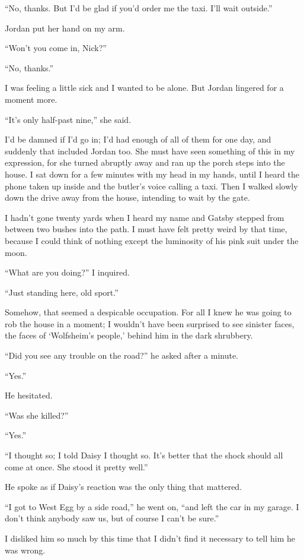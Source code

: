 \documentclass{znotebook}
\begin{document}
``No, thanks. But I'd be glad if you'd order me the taxi. I'll wait outside.''

Jordan put her hand on my arm.

``Won't you come in, Nick?''

``No, thanks.''

I was feeling a little sick and I wanted to be alone. But Jordan lingered for a moment more.

``It's only half-past nine,'' she said.

I'd be damned if I'd go in; I'd had enough of all of them for one day, and suddenly that included Jordan too. She must have seen something of this in my expression, for she turned abruptly away and ran up the porch steps into the house. I sat down for a few minutes with my head in my hands, until I heard the phone taken up inside and the butler's voice calling a taxi. Then I walked slowly down the drive away from the house, intending to wait by the gate.

I hadn't gone twenty yards when I heard my name and Gatsby stepped from between two bushes into the path. I must have felt pretty weird by that time, because I could think of nothing except the luminosity of his pink suit under the moon.

``What are you doing?'' I inquired.

``Just standing here, old sport.''

Somehow, that seemed a despicable occupation. For all I knew he was going to rob the house in a moment; I wouldn't have been surprised to see sinister faces, the faces of ‘Wolfsheim's people,' behind him in the dark shrubbery.

``Did you see any trouble on the road?'' he asked after a minute.

``Yes.''

He hesitated.

``Was she killed?''

``Yes.''

``I thought so; I told Daisy I thought so. It's better that the shock should all come at once. She stood it pretty well.''

He spoke as if Daisy's reaction was the only thing that mattered.

``I got to West Egg by a side road,'' he went on, ``and left the car in my garage. I don't think anybody saw us, but of course I can't be sure.''

I disliked him so much by this time that I didn't find it necessary to tell him he was wrong.
\end{document}
